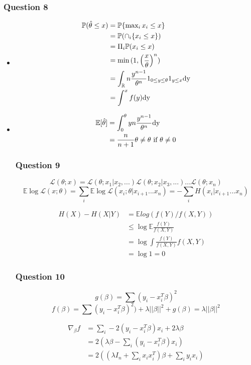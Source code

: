 \documentclass[12pt]{article}
\newcommand{\Q}[1]{\subsubsection*{Question #1}}
\begin{document}
\Q{8}
\begin{itemize}

\item
\begin{align}
  \mathbb{P}(\hat \theta \leq x) &= \mathbb{P}\{ \text{max}_i \, x_i \leq x \}\\
  &= \mathbb{P}(\cap_i \{ x_i \leq x \})\\
  &= \Pi_i \mathbb{P}(x_i \leq x)\\
  &= \text{min} \, (1, \left(\frac{x}{\theta}\right)^n)\\
  &= \int_{\mathbb{R}} n \frac{y^{n-1}}{\theta^n} 1_{0 \leq y \leq \theta} 1_{y \leq x} \rm{dy} \\
  &= \int^x f(y) \rm{dy}
\end{align}



\item
\begin{align}
\mathbb{E}[ \hat \theta] 
&= \int_0^{\theta} y n \frac{y^{n-1}}{\theta^n} \rm{dy} \\
&= \frac{n}{n+1} \theta \neq \theta \text{ if $\theta \neq 0$}
\end{align}


\Q{9}

$$\mathcal{L}(\theta; x) = \mathcal{L}(\theta; x_1 | x_2,...) \mathcal{L}(\theta; x_2 | x_3,...) ... \mathcal{L}(\theta; x_n)$$
$$\mathbb{E} \log \mathcal{L}(x; \theta) = \sum_i \mathbb{E} \log\mathcal{L}(x_i; \theta | x_{i+1} ... x_n) = - \sum_i H(x_i|x_{i+1}...x_n)$$


\begin{align}
H(X) - H(X|Y) &= 
\mathbb{E} log(f(Y)/f(X,Y)) \\
&\leq \log \mathbb{E} \frac{f(Y)}{f(X,Y)} \\
&= \log \int \frac{f(Y)}{f(X,Y)} f(X,Y)\\
&= \log 1 = 0
\end{align}

\Q{10}


$$g(\beta) = \sum (y_i - x_i^T \beta)^2$$
$$f(\beta) = \sum (y_i - x_i^T \beta)^2) + \lambda ||\beta||^2 + g(\beta) = \lambda ||\beta||^2$$

\begin{align}
\nabla_{\beta} f &= \sum_i -2 (y_i - x_i^T \beta) x_i + 2 \lambda \beta \\
&= 2 ( \lambda \beta - \sum_i(y_i - x_i^T \beta) x_i)\\
&= 2 ( (\lambda I_n + \sum_i x_i x_i^T) \beta + \sum_i y_i x_i)
\end{align}


\end{itemize}
\end{document}
